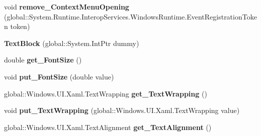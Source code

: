 \begin{DoxyCompactItemize}
\item 
\mbox{\label{class_windows_1_1_u_i_1_1_xaml_1_1_controls_1_1_text_block_ac298be0da72f4c9f2a436c5949a660d7}} 
void {\bfseries remove\+\_\+\+Context\+Menu\+Opening} (global\+::\+System.\+Runtime.\+Interop\+Services.\+Windows\+Runtime.\+Event\+Registration\+Token token)
\item 
\mbox{\label{class_windows_1_1_u_i_1_1_xaml_1_1_controls_1_1_text_block_a626ff976bc29fd838fa655f97f2533b0}} 
{\bfseries Text\+Block} (global\+::\+System.\+Int\+Ptr dummy)
\item 
\mbox{\label{class_windows_1_1_u_i_1_1_xaml_1_1_controls_1_1_text_block_ae396cab368662cf3d314b4c8cf21d51b}} 
double {\bfseries get\+\_\+\+Font\+Size} ()
\item 
\mbox{\label{class_windows_1_1_u_i_1_1_xaml_1_1_controls_1_1_text_block_a610333d337bf2e0cf5c901ca88ce3a21}} 
void {\bfseries put\+\_\+\+Font\+Size} (double value)
\item 
\mbox{\label{class_windows_1_1_u_i_1_1_xaml_1_1_controls_1_1_text_block_a7e6fe2e6c2baed541c6ec98293bfde3e}} 
global\+::\+Windows.\+U\+I.\+Xaml.\+Text\+Wrapping {\bfseries get\+\_\+\+Text\+Wrapping} ()
\item 
\mbox{\label{class_windows_1_1_u_i_1_1_xaml_1_1_controls_1_1_text_block_ac924a5e979a26efc36bd609cb83b92d7}} 
void {\bfseries put\+\_\+\+Text\+Wrapping} (global\+::\+Windows.\+U\+I.\+Xaml.\+Text\+Wrapping value)
\item 
\mbox{\label{class_windows_1_1_u_i_1_1_xaml_1_1_controls_1_1_text_block_ac6b29ca491dedd9ebb342072b1916a79}} 
global\+::\+Windows.\+U\+I.\+Xaml.\+Text\+Alignment {\bfseries get\+\_\+\+Text\+Alignment} ()
\item 
\mbox{\label{class_windows_1_1_u_i_1_1_xaml_1_1_controls_1_1_text_block_a284f18b28cc583c43ba5d9187d561ef7}} 

\end{DoxyCompactItemize}
